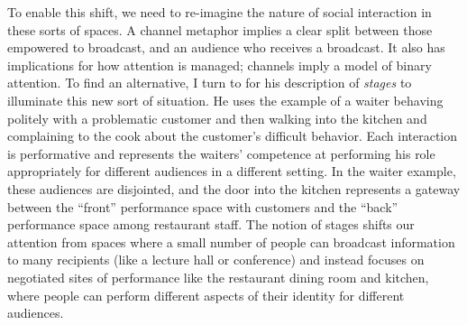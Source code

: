 



To enable this shift, we need to re-imagine the nature of social interaction in these sorts of spaces. A channel metaphor implies a clear split between those empowered to broadcast, and an audience who receives a broadcast. It also has implications for how attention is managed; channels imply a model of binary attention. To find an alternative, I turn to \citet{goffman_presentation_1959} for his description of \emph{stages} to illuminate this new sort of situation. He uses the example of a waiter behaving politely with a problematic customer and then walking into the kitchen and complaining to the cook about the customer's difficult behavior. Each interaction is performative and represents the waiters' competence at performing his role appropriately for different audiences in a different setting. In the waiter example, these audiences are disjointed, and the door into the kitchen represents a gateway between the ``front'' performance space with customers and the ``back'' performance space among restaurant staff. The notion of stages shifts our attention from spaces where a small number of people can broadcast information to many recipients (like a lecture hall or conference) and instead focuses on negotiated sites of performance like the restaurant dining room and kitchen, where people can perform different aspects of their identity for different audiences.

